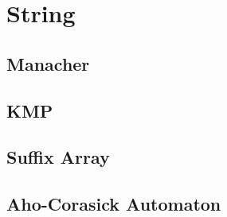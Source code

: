 \section{String}
	\subsection{Manacher}
		
	\subsection{KMP}
		
	\subsection{Suffix Array}
		
	\subsection{Aho-Corasick Automaton}
		
